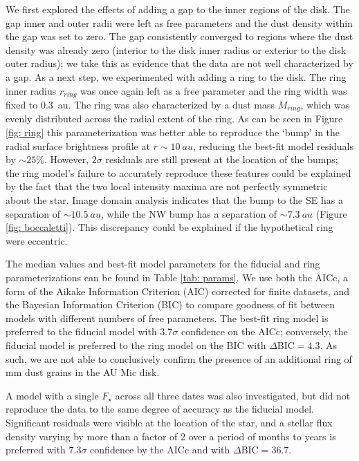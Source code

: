 \documentclass[modern]{aastex62}
\begin{document}
We first explored the effects of adding a gap  to the inner regions of the disk. 
The gap inner and outer radii were left as free parameters and the dust density within the gap was set to zero.
The gap consistently converged to regions where the dust density was already zero (interior to the disk inner radius or exterior to the disk outer radius); we take this as evidence that the data are not well characterized by a gap.
As a next step, we experimented with adding a ring to the disk. 
The ring inner radius $r_{ring}$ was once again left as a free parameter and the ring width was fixed to \SI{0.3}{au}.
The ring was also characterized by a dust mass $M_{ring}$, which was evenly distributed across the radial extent of the ring. 
As can be seen in Figure \ref{fig: ring} this parameterization was better able to reproduce the `bump' in the radial surface brightness profile at $r \sim \SI{10}{au}$, reducing the best-fit model residuals by $\sim 25 \%$. 
However, $2 \sigma$ residuals are still present at the location of the bumps; the ring model's failure to accurately reproduce these features could be explained by the fact that the two local intensity maxima are not perfectly symmetric about the star. 
Image domain analysis indicates that the bump to the SE has a separation of $\sim \SI{10.5}{au}$, while the NW bump has a separation of $\sim \SI{7.3}{au}$ (Figure \ref{fig: boccaletti}). 
This discrepancy could be explained if the hypothetical ring were eccentric.

The median values and best-fit model parameters for the fiducial and ring parameterizations can be found in Table \ref{tab: params}. 
We use both the AICc, a form of the Aikake Information Criterion (AIC) corrected for finite datasets, and the Bayesian Information Criterion (BIC) to compare goodness of fit between models with different numbers of free parameters.  
The best-fit ring model is preferred to the fiducial model with $3.7 \sigma$ confidence on the AICc; conversely, the fiducial model is preferred to the ring model on the BIC with $\Delta \text{BIC} = 4.3$.
As such, we are not able to conclusively confirm the presence of an additional ring of mm dust grains in the AU Mic disk.

A model with a single $F_\star$ across all three dates was also investigated, but did not reproduce the data to the same degree of accuracy as the fiducial model.
Significant residuals were visible at the location of the star, and  a stellar flux density varying by more than a factor of 2 over a period of months to years is preferred with $7.3 \sigma$ confidence by the AICc and with $\Delta \text{BIC} = 36.7$.
\end{document}
